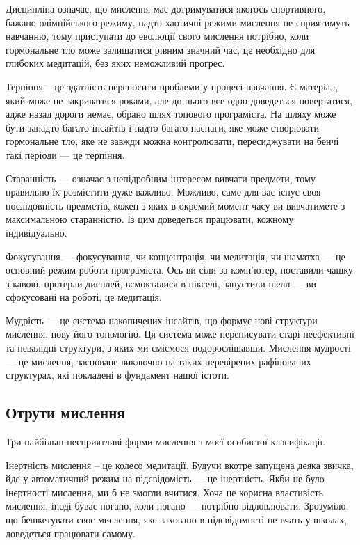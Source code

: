 Дисципліна означає, що мислення має дотримуватися якогось спортивного,
бажано олімпійського режиму, надто хаотичні режими мислення не
сприятимуть навчанню, тому приступати до еволюції свого мислення
потрібно, коли гормональне тло може залишатися рівним значний час,
це необхідно для глибоких медитацій, без яких неможливий прогрес.

Терпіння – це здатність переносити проблеми у процесі навчання.
Є матеріал, який може не закриватися роками, але до нього все
одно доведеться повертатися, адже назад дороги немає, обрано
шлях топового програміста. На шляху може бути занадто багато
інсайтів і надто багато наснаги, яке може створювати гормональне
тло, яке не завжди можна контролювати, пересиджувати на бенчі
такі періоди --- це терпіння.

Старанність --- означає з непідробним інтересом вивчати предмети,
тому правильно їх розмістити дуже важливо. Можливо, саме для вас
існує своя послідовність предметів, кожен з яких в окремий момент
часу ви вивчатимете з максимальною старанністю. Із цим доведеться
працювати, кожному індивідуально.

Фокусування --- фокусування, чи концентрація, чи медитація,
чи шаматха --- це основний режим роботи програміста. Ось ви
сіли за комп'ютер, поставили чашку з кавою, протерли дисплей,
всмокталися в пікселі, запустили шелл --- ви сфокусовані на
роботі, це медитація.

Мудрість --- це система накопичених інсайтів, що формує нові
структури мислення, нову його топологію. Ця система може
переписувати старі неефективні та невалідні структури,
з яких ми сміємося подорослішавши. Мислення мудрості --- це
мислення, засноване виключно на таких перевірених рафінованих
структурах, які покладені в фундамент нашої істоти.

\subsection{Отрути мислення}

Три найбільш несприятливі форми мислення з моєї особистої класифікації.

Інертність мислення – це колесо медитації. Будучи вкотре
запущена деяка звичка, йде у автоматичний режим на
підсвідомість --- це інертність. Якби не було інертності
мислення, ми б не змогли вчитися. Хоча це корисна властивість
мислення, іноді буває погано, коли погано --- потрібно
відловлювати. Зрозуміло, що бешкетувати своє мислення,
яке заховано в підсвідомості не вчать у школах, доведеться працювати самому.

